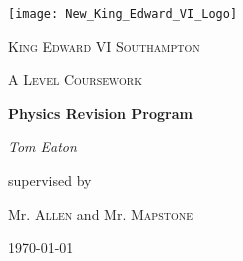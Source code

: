 \centering
\texttt{[image: New\_King\_Edward\_VI\_Logo]}\par\vspace{1cm}
{\scshape\LARGE King Edward VI Southampton\par}
\vspace{1cm}
{\scshape\Large A Level Coursework\par}
\vspace{1.5cm}
{\huge\bfseries Physics Revision Program\par}
\vspace{2cm}
{\Large\itshape Tom Eaton\par}
\vfill
supervised by\par
Mr. \textsc{Allen} and Mr. \textsc{Mapstone}

\vfill
{\large \today\par}
